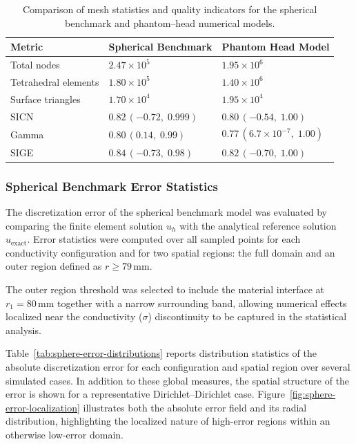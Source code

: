 \begin{table}[htbp]
\centering
\caption[Mesh statistics comparison]{Comparison of mesh statistics and quality indicators
for the spherical benchmark and phantom--head numerical models.}
\label{tab:mesh_comparison}
\small
\begin{tabularx}{\textwidth}{l X X}
\toprule
\textbf{Metric}
& \textbf{Spherical Benchmark}
& \textbf{Phantom Head Model} \\
\midrule
Total nodes
& $2.47 \times 10^{5}$
& $1.95 \times 10^{6}$ \\[3pt]

Tetrahedral elements
& $1.80 \times 10^{5}$
& $1.40 \times 10^{6}$ \\[3pt]

Surface triangles
& $1.70 \times 10^{4}$
& $1.95 \times 10^{4}$ \\[3pt]

SICN
& $0.82\,(-0.72,\;0.999)$
& $0.80\,(-0.54,\;1.00)$ \\[3pt]

Gamma
& $0.80\,(0.14,\;0.99)$
& $0.77\,(6.7\times10^{-7},\;1.00)$ \\[3pt]

SIGE
& $0.84\,(-0.73,\;0.98)$
& $0.82\,(-0.70,\;1.00)$ \\

\bottomrule
\end{tabularx}
\end{table}


\subsubsection{Spherical Benchmark Error Statistics}

The discretization error of the spherical benchmark model was evaluated by comparing the
finite element solution $u_h$ with the analytical reference solution $u_{\text{exact}}$.
Error statistics were computed over all sampled points for each conductivity configuration
and for two spatial regions: the full domain and an outer region defined as $r \ge 79\,\mathrm{mm}$.

The outer region threshold was selected to include the material interface at
$r_1 = 80\,\mathrm{mm}$ together with a narrow surrounding band, allowing numerical effects
localized near the conductivity ($\sigma$) discontinuity to be captured in the statistical analysis.

Table~\ref{tab:sphere-error-distributions} reports distribution statistics of the absolute
discretization error for each configuration and spatial region over several simulated cases. In addition to these global
measures, the spatial structure of the error is shown for a representative
Dirichlet--Dirichlet case. Figure~\ref{fig:sphere-error-localization} illustrates both the
absolute error field and its radial distribution, highlighting the localized nature of
high-error regions within an otherwise low-error domain.


